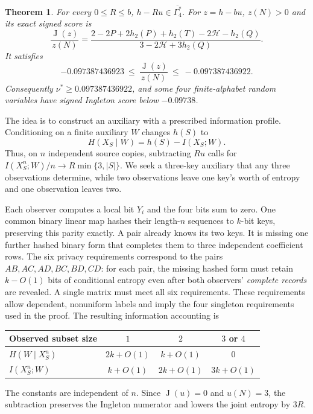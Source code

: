 \documentclass[a4paper,11pt]{article}
\newtheorem{theorem}{Theorem}
\newcommand{\AEcone}{\overline{\Gamma_4^{*}}}
\newcommand{\Ing}{\operatorname{J}}
\newcommand{\hb}{h_2}
\begin{document}
\begin{samepage}
\begin{theorem}\label{thm:main}
For every $0\le R\le b$, $h-Ru\in\AEcone$.
For $z=h-bu$, $z(N)>0$ and its exact signed score is
\[
 \frac{\Ing(z)}{z(N)}=
 \frac{2-2P+2\hb(P)+\hb(T)-2\mathcal H-\hb(Q)}
      {3-2\mathcal H+3\hb(Q)}.
\]
It satisfies
\begin{equation}\label{eq:scorebox}
 -0.097387436923\ \le\ \frac{\Ing(z)}{z(N)}\ \le\ -0.097387436922.
\end{equation}
Consequently $\nu^*\ge0.097387436922$, and some four finite-alphabet
random variables have signed Ingleton score below $-0.09738$.
\end{theorem}
\end{samepage}

The idea is to construct an auxiliary with a prescribed information
profile. Conditioning on a finite auxiliary $W$ changes $h(S)$ to
\[
 H(X_S\mid W)=h(S)-I(X_S;W).
\]
Thus, on $n$ independent source copies, subtracting $Ru$ calls for
$I(X_S^n;W)/n\to R\min\{3,|S|\}$. We seek a three-key auxiliary
that any three observations determine, while two observations leave
one key's worth of entropy and one observation leaves two.

Each observer computes a local bit $Y_i$ and the four bits sum to zero.
One common binary linear map hashes their length-$n$ sequences to
$k$-bit keys, preserving this parity exactly. A pair already knows its
two keys. It is missing one further hashed binary form that completes
them to three independent coefficient rows. The six privacy requirements
correspond to the pairs $AB,AC,AD,BC,BD,CD$: for each pair, the missing
hashed form must retain $k-O(1)$ bits of conditional entropy even after
both observers' \emph{complete records} are revealed. A single matrix
must meet all six requirements. These requirements allow dependent,
nonuniform labels and imply the four singleton requirements used in the
proof. The resulting information accounting is
\begin{center}
\begin{tabular}{@{}lccc@{}}
\toprule
Observed subset size & $1$ & $2$ & $3$ or $4$\\
\midrule
$H(W\mid X_S^n)$ & $2k+O(1)$ & $k+O(1)$ & $0$\\
$I(X_S^n;W)$ & $k+O(1)$ & $2k+O(1)$ & $3k+O(1)$\\
\bottomrule
\end{tabular}
\end{center}
The constants are independent of $n$. Since $\Ing(u)=0$ and $u(N)=3$,
the subtraction preserves the Ingleton numerator and lowers the joint
entropy by $3R$.
\end{document}
